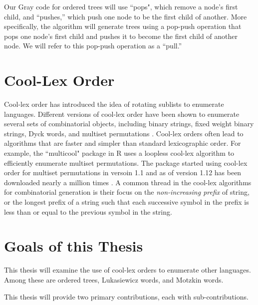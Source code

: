 Our Gray code for ordered trees will use ``pops", which remove a node's first child, and ``pushes,'' which push one node to be the first child of another.  More specifically, the algorithm will generate trees using a pop-push operation that pops one node's first child and pushes it to become the first child of another node.  We will refer to this pop-push operation as a ``pull.''


\section{Cool-Lex Order}
Cool-lex order has introduced the idea of rotating sublists to enumerate languages.  Different versions of cool-lex order have been shown to enumerate several sets of combinatorial objects, including binary strings, fixed weight binary strings, Dyck words, and multiset permutations \cite{williams2009shift}.  Cool-lex orders often lead to algorithms that are faster and simpler than standard lexicographic order.  For example, the ``multicool" package in R uses a loopless cool-lex algorithm to efficiently enumerate multiset permutations.   The package started using cool-lex order for multiset permutations in versoin 1.1 and as of version 1.12 has been downloaded nearly a million times \cite{multicool_2021}.  A common thread in the cool-lex algorithms for combinatorial generation is their focus on the \emph{non-increasing prefix} of string, or the longest prefix of a string such that each successive symbol in the prefix is less than or equal to the previous symbol in the string.

\section{Goals of this Thesis}



This thesis will examine the use of cool-lex orders to enumerate other languages. Among these are ordered trees, Lukasiewicz words, and Motzkin words. 

This thesis will provide two primary contributions, each with sub-contributions.  

